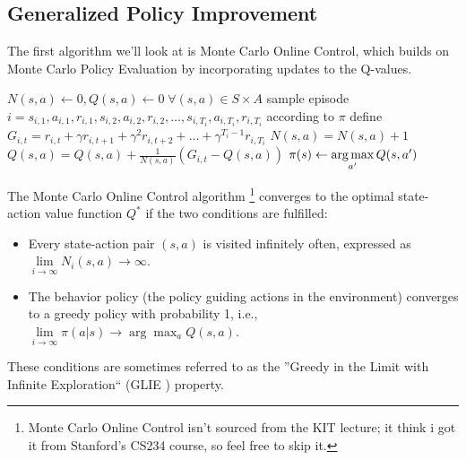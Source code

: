   \subsection{Generalized Policy Improvement}
  The first algorithm we’ll look at is Monte Carlo Online Control, which builds on 
  Monte Carlo Policy Evaluation by incorporating updates to the Q-values.
  \begin{algorithm}[H]
    \caption{Monte Carlo Online Control}\label{Monte Carlo online control}
    \begin{algorithmic}
      \STATE $N(s,a)\gets 0, Q(s,a)\gets 0 \; \forall (s,a) \in S \times A$
      \STATE sample episode $i = s_{i,1},a_{i,1},r_{i,1},s_{i,2},a_{i,2},r_{i,2},\dots,s_{i,T_i},a_{i,T_i},r_{i,T_i}$ according to $\pi$ 
      \STATE define $G_{i,t} = r_{i,t}+ \gamma  r_{i,t+1} + \gamma^2  r_{i,t+2} + \dots +  \gamma^{T_i -1}  r_{i,T_i} $ 
      \STATE $N(s,a)= N(s,a)+1$
      \STATE $Q(s,a) = Q(s,a)+ \frac{1}{N(s,a)}(G_{i,t}-Q(s,a))$
      \STATE $\pi(s) \gets \operatorname*{arg\,max}\limits_{a'} Q(s,a')$
      \ENDIF
      \ENDFOR
      \ENDFOR
    \end{algorithmic}
  \end{algorithm}
  The Monte Carlo Online Control algorithm \footnote{ Monte Carlo Online Control isn’t sourced from the KIT lecture; it think i got it from Stanford’s CS234 course, so feel free to skip it.} converges to the optimal state-action 
  value function $Q^*$ if the two conditions are fulfilled:
  \begin{itemize}
    \item Every state-action pair $(s, a)$ is visited infinitely often, expressed as
      $\lim\limits_{i \to \infty} N_i(s, a) \to \infty$.
    \item The behavior policy (the policy guiding actions in the environment) converges
      to a greedy policy with probability 1, i.e., $\lim\limits_{i \to \infty} \pi(a|s) \to \arg\max_a Q(s, a)$.
  \end{itemize}
  These conditions are sometimes referred to as the ''Greedy in the Limit with Infinite Exploration``
  (GLIE \label{glie}) property.

